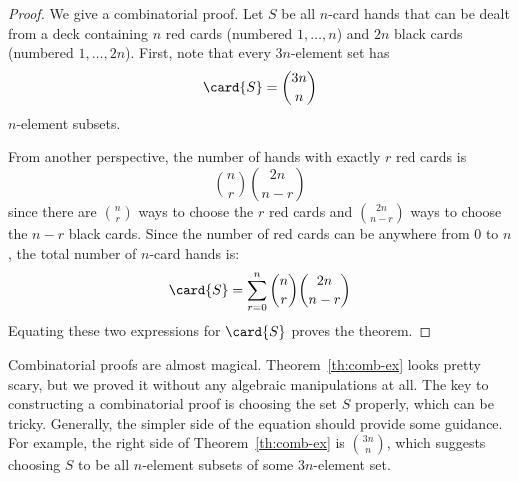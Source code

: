 \begin{proof}
We give a combinatorial proof.  Let $S$ be all $n$-card hands that can
be dealt from a deck containing $n$ red cards (numbered $1, \dots,
n$) and $2n$ black cards (numbered $1, \dots, 2n$).  First, note that
every $3n$-element set has
%
\[
\card{S} = \binom{3n}{n}
\]
%
$n$-element subsets.

From another perspective, the number of hands with exactly $r$ red
cards is
%
\[
\binom{n}{r} \binom{2n}{n - r}
\]
%
since there are $\binom{n}{r}$ ways to choose the $r$ red cards and
$\binom{2n}{n - r}$ ways to choose the $n - r$ black cards.  Since the
number of red cards can be anywhere from 0 to $n$, the total number of
$n$-card hands is:
%
\[
\card{S} = \sum_{r=0}^n \binom{n}{r} \binom{2n}{n-r}
\]
%
Equating these two expressions for $\card{S}$ proves the theorem.
\end{proof}

Combinatorial proofs are almost magical.  Theorem~\ref{th:comb-ex}
looks pretty scary, but we proved it without any algebraic
manipulations at all.  The key to constructing a combinatorial proof
is choosing the set $S$ properly, which can be tricky.  Generally, the
simpler side of the equation should provide some guidance.  For
example, the right side of Theorem~\ref{th:comb-ex} is
$\binom{3n}{n}$, which suggests choosing $S$ to be all $n$-element
subsets of some $3n$-element set.

\endinput
